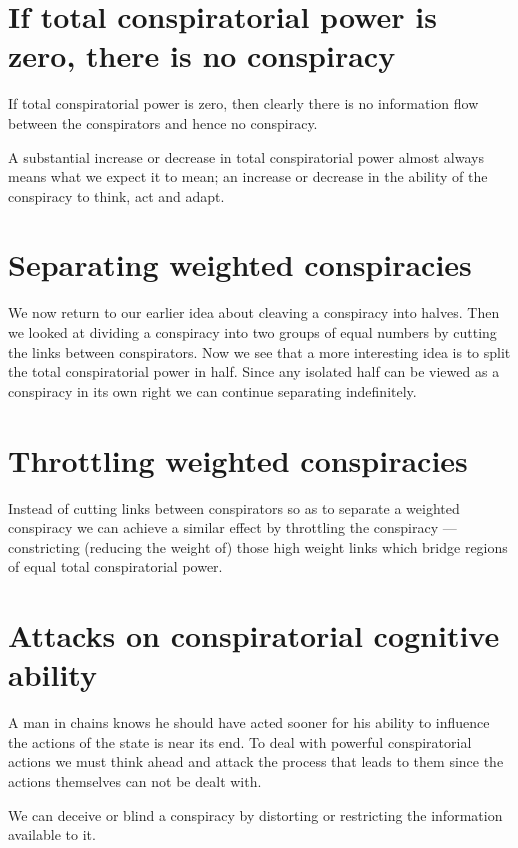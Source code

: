 \documentclass[letterpaper,12pt,english]{sphinxmanual}
\begin{document}
\section{If total conspiratorial power is zero, there is no conspiracy}
\label{assange:if-total-conspiratorial-power-is-zero-there-is-no-conspiracy}
If total conspiratorial power is zero, then clearly there is no information flow between the conspirators and hence no conspiracy.

A substantial increase or decrease in total conspiratorial power almost always means what we expect it to mean; an increase or decrease in the ability of the conspiracy to think, act and adapt.


\section{Separating weighted conspiracies}
\label{assange:separating-weighted-conspiracies}
We now return to our earlier idea about cleaving a conspiracy into halves. Then we looked at dividing a conspiracy into two groups of equal numbers by cutting the links between conspirators. Now we see that a more interesting idea is to split the total conspiratorial power in half. Since any isolated half can be viewed as a conspiracy in its own right we can continue separating indefinitely.


\section{Throttling weighted conspiracies}
\label{assange:throttling-weighted-conspiracies}
Instead of cutting links between conspirators so as to separate a weighted conspiracy we can achieve a similar effect by throttling the conspiracy — constricting (reducing the weight of) those high weight links which bridge regions of equal total conspiratorial power.


\section{Attacks on conspiratorial cognitive ability}
\label{assange:attacks-on-conspiratorial-cognitive-ability}
A man in chains knows he should have acted sooner for his ability to influence the actions of the state is near its end. To deal with powerful conspiratorial actions we must think ahead and attack the process that leads to them since the actions themselves can not be dealt with.

We can deceive or blind a conspiracy by distorting or restricting the information available to it.
\end{document}
